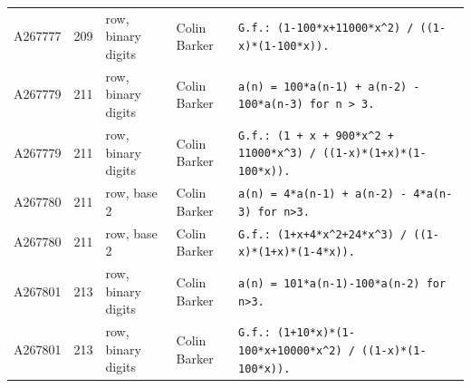 \documentclass[11pt]{article}
\theoremstyle{definition}
\theoremstyle{remark}
\begin{document}
{\begin{longtable}{p{1.3cm}p{0.7cm}p{2.4cm}p{2.3cm}p{7.3cm}}
A267777 & 209 & row, binary digits & Colin Barker & \texttt{G.f.: \allowbreak{}(1-\allowbreak{}100*\allowbreak{}x+\allowbreak{}11000*\allowbreak{}x\^{}2)\allowbreak{} \allowbreak{}/\allowbreak{} \allowbreak{}((1-\allowbreak{}x)\allowbreak{}*\allowbreak{}(1-\allowbreak{}100*\allowbreak{}x)\allowbreak{})\allowbreak{}.} \\
A267779 & 211 & row, binary digits & Colin Barker & \texttt{a(n)\allowbreak{} \allowbreak{}=\allowbreak{} \allowbreak{}100*\allowbreak{}a(n-\allowbreak{}1)\allowbreak{} \allowbreak{}+\allowbreak{} \allowbreak{}a(n-\allowbreak{}2)\allowbreak{} \allowbreak{}-\allowbreak{} \allowbreak{}100*\allowbreak{}a(n-\allowbreak{}3)\allowbreak{} \allowbreak{}for \allowbreak{}n \allowbreak{}> \allowbreak{}3.} \\
A267779 & 211 & row, binary digits & Colin Barker & \texttt{G.f.: \allowbreak{}(1 \allowbreak{}+\allowbreak{} \allowbreak{}x \allowbreak{}+\allowbreak{} \allowbreak{}900*\allowbreak{}x\^{}2 \allowbreak{}+\allowbreak{} \allowbreak{}11000*\allowbreak{}x\^{}3)\allowbreak{} \allowbreak{}/\allowbreak{} \allowbreak{}((1-\allowbreak{}x)\allowbreak{}*\allowbreak{}(1+\allowbreak{}x)\allowbreak{}*\allowbreak{}(1-\allowbreak{}100*\allowbreak{}x)\allowbreak{})\allowbreak{}.} \\
A267780 & 211 & row, base 2 & Colin Barker & \texttt{a(n)\allowbreak{} \allowbreak{}=\allowbreak{} \allowbreak{}4*\allowbreak{}a(n-\allowbreak{}1)\allowbreak{} \allowbreak{}+\allowbreak{} \allowbreak{}a(n-\allowbreak{}2)\allowbreak{} \allowbreak{}-\allowbreak{} \allowbreak{}4*\allowbreak{}a(n-\allowbreak{}3)\allowbreak{} \allowbreak{}for \allowbreak{}n>3.} \\
A267780 & 211 & row, base 2 & Colin Barker & \texttt{G.f.: \allowbreak{}(1+\allowbreak{}x+\allowbreak{}4*\allowbreak{}x\^{}2+\allowbreak{}24*\allowbreak{}x\^{}3)\allowbreak{} \allowbreak{}/\allowbreak{} \allowbreak{}((1-\allowbreak{}x)\allowbreak{}*\allowbreak{}(1+\allowbreak{}x)\allowbreak{}*\allowbreak{}(1-\allowbreak{}4*\allowbreak{}x)\allowbreak{})\allowbreak{}.} \\
A267801 & 213 & row, binary digits & Colin Barker & \texttt{a(n)\allowbreak{} \allowbreak{}=\allowbreak{} \allowbreak{}101*\allowbreak{}a(n-\allowbreak{}1)\allowbreak{}-\allowbreak{}100*\allowbreak{}a(n-\allowbreak{}2)\allowbreak{} \allowbreak{}for \allowbreak{}n>3.} \\
A267801 & 213 & row, binary digits & Colin Barker & \texttt{G.f.: \allowbreak{}(1+\allowbreak{}10*\allowbreak{}x)\allowbreak{}*\allowbreak{}(1-\allowbreak{}100*\allowbreak{}x+\allowbreak{}10000*\allowbreak{}x\^{}2)\allowbreak{} \allowbreak{}/\allowbreak{} \allowbreak{}((1-\allowbreak{}x)\allowbreak{}*\allowbreak{}(1-\allowbreak{}100*\allowbreak{}x)\allowbreak{})\allowbreak{}.} \\

\end{longtable}}
\end{document}
